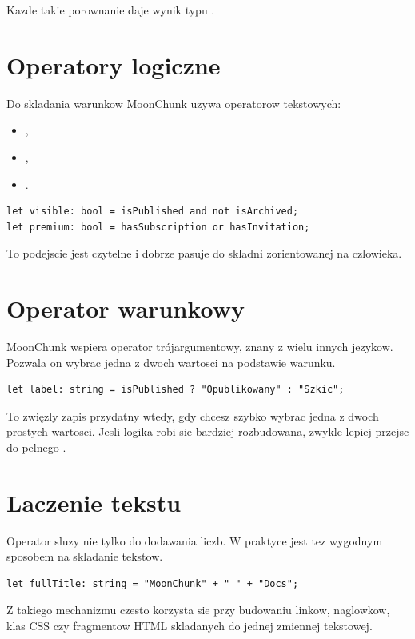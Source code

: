 Kazde takie porownanie daje wynik typu .

\section{Operatory logiczne}
Do skladania warunkow MoonChunk uzywa operatorow tekstowych:

\begin{itemize}
  \item {},
  \item {},
  \item {}.
\end{itemize}

\begin{lstlisting}[style=moonchunk,caption={Logika w MoonChunk}]
let visible: bool = isPublished and not isArchived;
let premium: bool = hasSubscription or hasInvitation;
\end{lstlisting}

To podejscie jest czytelne i dobrze pasuje do skladni zorientowanej na czlowieka.

\section{Operator warunkowy}
MoonChunk wspiera operator trójargumentowy, znany z wielu innych jezykow.
Pozwala on wybrac jedna z dwoch wartosci na podstawie warunku.

\begin{lstlisting}[style=moonchunk,caption={Operator warunkowy}]
let label: string = isPublished ? "Opublikowany" : "Szkic";
\end{lstlisting}

To zwięzly zapis przydatny wtedy, gdy chcesz szybko wybrac jedna z dwoch prostych wartosci.
Jesli logika robi sie bardziej rozbudowana, zwykle lepiej przejsc do pelnego .

\section{Laczenie tekstu}
Operator \mc{+} sluzy nie tylko do dodawania liczb. W praktyce jest tez wygodnym sposobem
na skladanie tekstow.

\begin{lstlisting}[style=moonchunk,caption={Laczenie tekstu}]
let fullTitle: string = "MoonChunk" + " " + "Docs";
\end{lstlisting}

Z takiego mechanizmu czesto korzysta sie przy budowaniu linkow, naglowkow, klas CSS
czy fragmentow HTML skladanych do jednej zmiennej tekstowej.

